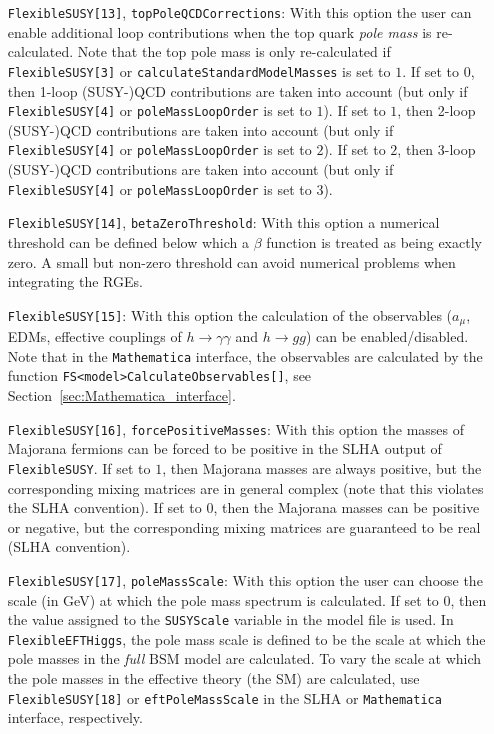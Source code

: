 \documentclass[final,3p,11pt,pdflatex]{elsarticle}
\makeatletter
\newcommand{\fs}{\texttt{FlexibleSUSY}\@\xspace}
\newcommand{\feft}{\texttt{Flex\-ib\-le\-EFT\-Higgs}\@\xspace}
\newcommand{\mathematica}{\texttt{Ma\-the\-ma\-ti\-ca}\xspace}
\newcommand{\code}[1]{\lstinline|#1|}  %
\newcommand{\BSM}{\ensuremath{\text{BSM}}\xspace}
\newcommand{\amu}{\ensuremath{a_\mu}\xspace}
\newcommand{\secref}[1]{Section~\ref{#1}}
\makeatother
\begin{document}
\begin{itemize}
\item[\texttt{FlexibleSUSY[13]},] \texttt{topPoleQCDCorrections}: With
  this option the user can enable additional loop contributions when
  the top quark \emph{pole mass} is re-calculated.  Note that the top pole mass
  is only re-calculated if \texttt{FlexibleSUSY[3]} or
  \texttt{calculateStandardModelMasses} is set to $1$.  If set to
  $0$, then 1-loop (SUSY-)QCD contributions are taken into account (but
  only if \texttt{FlexibleSUSY[4]} or \texttt{poleMassLoopOrder} is
  set to $1$).  If set to $1$, then 2-loop (SUSY-)QCD contributions are
  taken into account (but only if \texttt{FlexibleSUSY[4]} or
  \texttt{poleMassLoopOrder} is set to $2$).  If set to $2$, then
  3-loop (SUSY-)QCD contributions are taken into account (but only if
  \texttt{FlexibleSUSY[4]} or \texttt{poleMassLoopOrder} is set to
  $3$).

\item[\texttt{FlexibleSUSY[14]},] \texttt{betaZeroThreshold}: With
  this option a numerical threshold can be defined below which a
  $\beta$ function is treated as being exactly zero.  A small but
  non-zero threshold can avoid numerical problems when integrating the
  RGEs.

\item[\texttt{FlexibleSUSY[15]}:] With this option the calculation of
  the observables ($\amu$, EDMs, effective couplings of
  $h\rightarrow\gamma\gamma$ and $h\rightarrow gg$) can be
  enabled/disabled.  Note that in the \mathematica interface, the
  observables are calculated by the function
  \code{FS<model>CalculateObservables[]}, see
  \secref{sec:Mathematica_interface}.

\item[\texttt{FlexibleSUSY[16]},] \texttt{forcePositiveMasses}: With
  this option the masses of Majorana fermions can be forced to be
  positive in the SLHA output of \fs.  If set to $1$, then Majorana
  masses are always positive, but the corresponding mixing matrices
  are in general complex (note that this violates the SLHA
  convention).  If set to $0$, then the Majorana masses can be
  positive or negative, but the corresponding mixing matrices are
  guaranteed to be real (SLHA convention).

\item[\texttt{FlexibleSUSY[17]},] \texttt{poleMassScale}: With this
  option the user can choose the scale (in GeV) at which the pole mass
  spectrum is calculated.  If set to $0$, then the value assigned to
  the \code{SUSYScale} variable in the model file is used.  In \feft,
  the pole mass scale is defined to be the scale at which the pole
  masses in the \emph{full} \BSM model are calculated.  To vary the
  scale at which the pole masses in the effective theory (the
  SM) are calculated, use \texttt{FlexibleSUSY[18]} or
  \texttt{eftPoleMassScale} in the SLHA or \mathematica interface,
  respectively.


\end{itemize}
\end{document}
